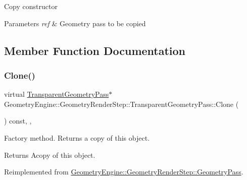 Copy constructor 
\begin{DoxyParams}{Parameters}
{\em ref} & Geometry pass to be copied \\
\hline
\end{DoxyParams}


\subsection{Member Function Documentation}
\mbox{\label{class_geometry_engine_1_1_geometry_render_step_1_1_transparent_geometry_pass_a6bfc83f45b84112bbf1beda1ed8e5466}} 
\subsubsection{\texorpdfstring{Clone()}{Clone()}}
{\footnotesize\ttfamily virtual \mbox{\hyperlink{class_geometry_engine_1_1_geometry_render_step_1_1_transparent_geometry_pass}{Transparent\+Geometry\+Pass}}$\ast$ Geometry\+Engine\+::\+Geometry\+Render\+Step\+::\+Transparent\+Geometry\+Pass\+::\+Clone (\begin{DoxyParamCaption}{ }\end{DoxyParamCaption}) const\hspace{0.3cm}{\ttfamily [inline]}, {\ttfamily [override]}, {\ttfamily [virtual]}}

Factory method. Returns a copy of this object. \begin{DoxyReturn}{Returns}
Acopy of this object. 
\end{DoxyReturn}


Reimplemented from \mbox{\hyperlink{class_geometry_engine_1_1_geometry_render_step_1_1_geometry_pass_a12e85a0169cb7b92cb8bd7b7fe100b33}{Geometry\+Engine\+::\+Geometry\+Render\+Step\+::\+Geometry\+Pass}}.

\mbox{\label{class_geometry_engine_1_1_geometry_render_step_1_1_transparent_geometry_pass_a4f8821d67b06746fa1c1aba1f70e1b83}} 
